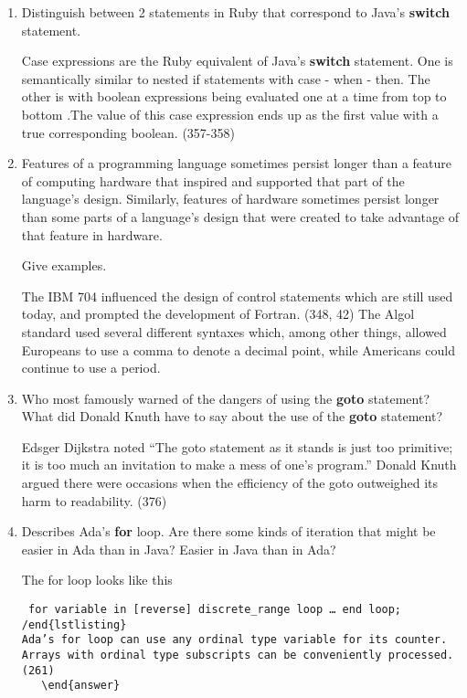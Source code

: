 \begin{enumerate}
  \item Distinguish between 2 statements in Ruby
    that correspond to Java's \textbf{switch} statement.

 \begin{answer}
    Case expressions are the Ruby equivalent of Java's \textbf{switch} statement. One is semantically similar to nested if statements with case - when - then. The other is with boolean expressions being evaluated one at a time from top to bottom .The value of this case expression ends up as the first value with a true corresponding boolean. (357-358)
     \end{answer}

  \item Features of a programming language sometimes persist
    longer than a feature of computing hardware that inspired
    and supported that part of the language's design.
    Similarly, features of hardware sometimes persist longer
    than some parts of a language's design that were created
    to take advantage of that feature in hardware.

    Give examples.

 \begin{answer}
    The IBM 704 influenced the design of control statements which are still used today, and prompted the development of Fortran. (348, 42) The Algol standard used several different syntaxes which, among other things, allowed Europeans to use a comma to denote a decimal point, while Americans could continue to use a period.
     \end{answer}

  \item Who most famously warned of the dangers of using the
    \textbf{goto} statement? What did Donald Knuth have to
    say about the use of the \textbf{goto} statement?

 \begin{answer}
    Edsger Dijkstra noted “The goto statement as it stands is just too primitive; it is too much an invitation to make a mess of one’s program.” Donald Knuth argued there were occasions when the efficiency of the goto outweighed its harm to readability. (376)
     \end{answer}

  \item Describes Ada's \textbf{for} loop. Are there some
    kinds of iteration that might be easier in Ada than
    in Java? Easier in Java than in Ada?

 \begin{answer}
    The for loop looks like this
\begin{lstlisting} for variable in [reverse] discrete_range loop … end loop; /end{lstlisting}
Ada’s for loop can use any ordinal type variable for its counter. Arrays with ordinal type subscripts can be conveniently processed. (261)
   \end{answer}
   

\end{lstlisting}
\end{answer}
\end{enumerate}
